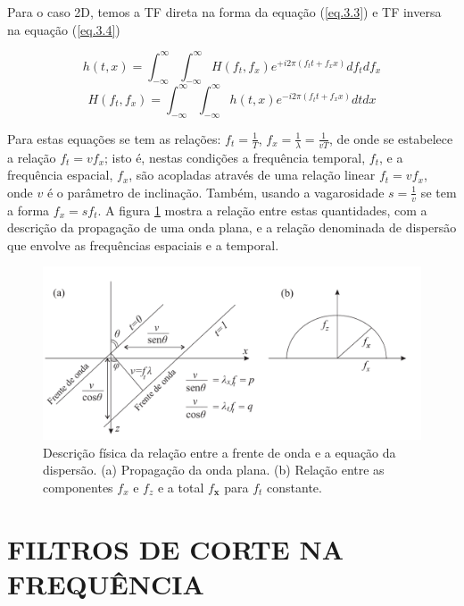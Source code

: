 Para o caso 2D, temos a TF direta na forma da equação (\ref{eq.3.3}) e TF inversa na equação (\ref{eq.3.4})

\begin{equation}
h(t, x)=\int_{-\infty}^{\infty} \int_{-\infty}^{\infty} H(f_{t}, f_{x}) e^{+i 2 \pi(f_{t} t+f_{x} x)} df_{t} df_{x}
\label{eq.3.3}
\end{equation}
\begin{equation}
H(f_{t}, f_{x})=\int_{-\infty}^{\infty} \int_{-\infty}^{\infty} h(t, x) e^{-i 2 \pi(f_{t} t+f_{x} x)} dt dx
\label{eq.3.4}
\end{equation}

Para estas equações se tem as relações: $f_{t}=\frac{1}{T} $, $f_{x}=\frac{1}{\lambda}=\frac{1}{vT}$, de onde se estabelece a relação $f_{t}=vf_{x}$; isto é, nestas condições a frequência temporal, $f_{t}$, e a frequência espacial, $f_{x}$, são acopladas através de uma relação linear $f_{t}=vf_{x}$, onde $v$ é o parâmetro de inclinação.
Também, usando a vagarosidade $s=\frac{1}{v}$ se tem a forma $f_{x}=sf_{t}$. 
A figura \ref{fig:Relacao_Dispersao} mostra a relação entre estas quantidades, com a descrição da propagação de uma onda plana, e a relação denominada de dispersão que envolve as frequências espaciais e a temporal.

\begin{figure}[H]
\centering
\includegraphics[width=12cm]{figuras/cap2/Relacao_Dispersao.pdf}
\vspace{-0.3cm}
\caption{Descrição física da relação entre a frente de onda e a equação da dispersão. 
(a) Propagação da onda plana. 
(b) Relação entre as componentes $f_{x}$ e $f_{z}$ e a total $f_{\mathbf{x}}$ para $f_{t}$ constante.}
\label{fig:Relacao_Dispersao}
\end{figure}

\section{FILTROS DE CORTE NA FREQUÊNCIA}

